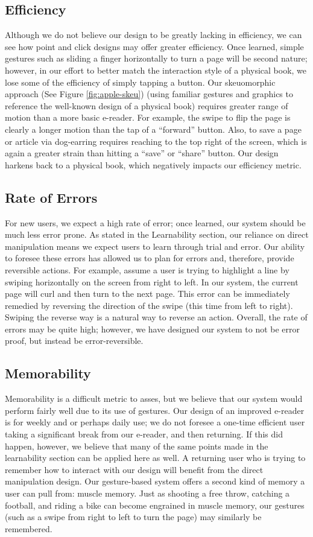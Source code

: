 \documentclass[11pt, oneside]{article}   	%
\begin{document}
\subsection {Efficiency}
Although we do not believe our design to be greatly lacking in efficiency, we can see how point and click designs may offer greater efficiency. Once learned, simple gestures such as sliding a finger horizontally to turn a page will be second nature; however, in our effort to better match the interaction style of a physical book, we lose some of the efficiency of simply tapping a button. Our skeuomorphic approach (See Figure \ref{fig:apple-skeu}) (using familiar gestures and graphics to reference the well-known design of a physical book) requires greater range of motion than a more basic e-reader. For example, the swipe to flip the page is clearly a longer motion than the tap of a ``forward'' button. Also, to save a page or article via dog-earring requires reaching to the top right of the screen, which is again a greater strain than hitting a  ``save'' or ``share'' button. Our design harkens back to a physical book, which negatively impacts our efficiency metric.


\subsection {Rate of Errors}
For new users, we expect a high rate of error; once learned, our system should be much less error prone. As stated in the Learnability section, our reliance on direct manipulation means we expect users to learn through trial and error. Our ability to foresee these errors has allowed us to plan for errors and, therefore, provide reversible actions. For example, assume a user is trying to highlight a line by swiping horizontally on the screen from right to left. In our system, the current page will curl and then turn to the next page. This error can be immediately remedied by reversing the direction of the swipe (this time from left to right). Swiping the reverse way is a natural way to reverse an action. Overall, the rate of errors may be quite high; however, we have designed our system to not be error proof, but instead be error-reversible.
\subsection {Memorability}
Memorability is a difficult metric to asses, but we believe that our system would perform fairly well due to its use of gestures. Our design of an improved e-reader is for weekly and or perhaps daily use; we do not foresee a one-time efficient user taking a significant break from our e-reader, and then returning. If this did happen, however, we believe that many of the same points made in the learnability section can be applied here as well. A returning user who is trying to remember how to interact with our design will benefit from the direct manipulation design. Our gesture-based system offers a second kind of memory a user can pull from: muscle memory. Just as shooting a free throw, catching a football, and riding a bike can become engrained in muscle memory, our gestures (such as a swipe from right to left to turn the page) may similarly be remembered.
\end{document}
